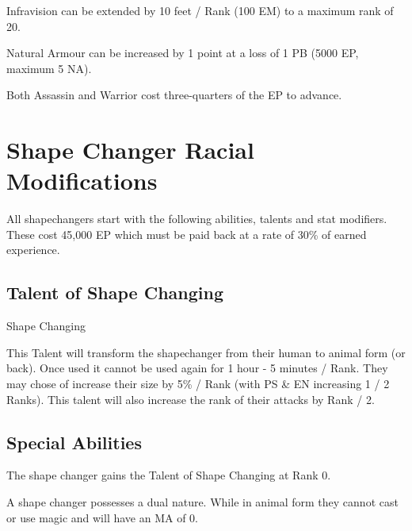 \documentclass[a4paper]{article}
\begin{document}
\begin{multicols*}{3}
\begin{Enumerate}
\item
  Infravision can be extended by 10 feet / Rank (100 EM) to a maximum rank of 20.

\item
  Natural Armour can be increased by 1 point at a loss of 1 PB (5000 EP, maximum 5 NA).

\item
  Both Assassin and Warrior cost three-quarters of the EP to advance.
\end{Enumerate}



\section{Shape Changer Racial Modifications}

All shapechangers start with the following abilities, talents and stat
modifiers.  These cost 45,000 EP which must be paid back at a
rate of 30\% of earned experience.

\subsection{Talent of Shape Changing}

\begin{talent}{Shape Changing}
\begin{effects}
  This Talent will transform the shapechanger from their human to
  animal form (or back).  Once used it cannot be used again for 1 hour
  - 5 minutes / Rank.  They may chose of increase their size by 5\% /
  Rank (with PS \& EN increasing 1 / 2 Ranks).  This talent will also
  increase the rank of their attacks by Rank / 2.
\end{effects}
\end{talent}


\subsection{Special Abilities}

\begin{Enumerate}
\item The shape changer gains the Talent of Shape Changing at Rank 0.
  
\item
  A shape changer possesses a dual nature. While in animal form they
  cannot cast or use magic and will have an MA of 0.
  

\end{Enumerate}
\end{multicols*}
\end{document}
